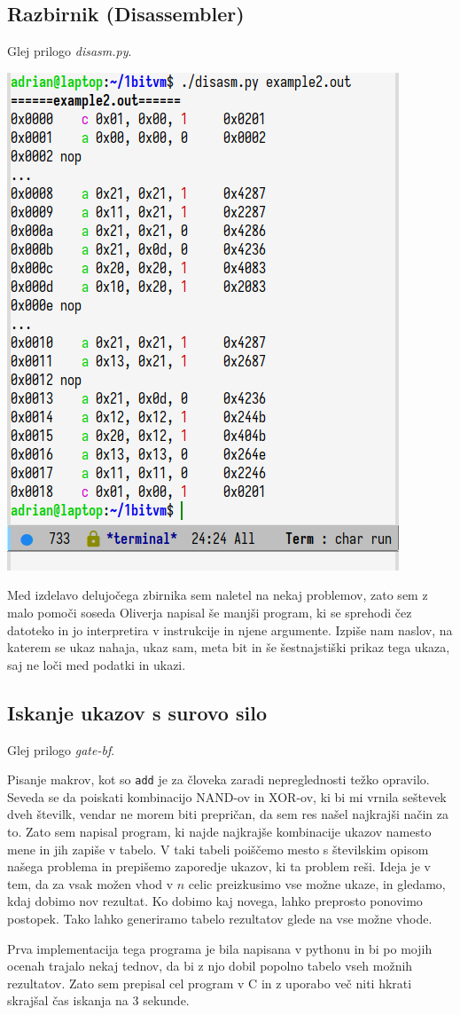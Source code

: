 \documentclass[12pt]{article}
\begin{document}
\subsection{Razbirnik (Disassembler)}
Glej prilogo \textit{disasm.py}.


\begin{center}
  \includegraphics[width=.4\linewidth]{slike/razbirnik.png}
\end{center}
\hfill
Med izdelavo delujočega zbirnika sem naletel na nekaj problemov, zato sem z malo pomoči soseda Oliverja napisal še manjši program, ki se sprehodi čez datoteko in jo interpretira v instrukcije in njene argumente.
Izpiše nam naslov, na katerem se ukaz nahaja, ukaz sam, meta bit in še šestnajstiški prikaz tega ukaza, saj ne loči med podatki in ukazi.

\subsection{Iskanje ukazov s surovo silo}
Glej prilogo \textit{gate-bf}.

Pisanje makrov, kot so \texttt{add} je za človeka zaradi nepreglednosti težko opravilo.
Seveda se da poiskati kombinacijo NAND-ov in XOR-ov, ki bi mi vrnila seštevek dveh številk, vendar ne morem biti prepričan, da sem res našel najkrajši način za to.
Zato sem napisal program, ki najde najkrajše kombinacije ukazov namesto mene in jih zapiše v tabelo.
V taki tabeli poiščemo mesto s številskim opisom našega problema in prepišemo zaporedje ukazov, ki ta problem reši.
Ideja je v tem, da za vsak možen vhod v $n$ celic preizkusimo vse možne ukaze, in gledamo, kdaj dobimo nov rezultat.
Ko dobimo kaj novega, lahko preprosto ponovimo postopek.
Tako lahko generiramo tabelo rezultatov glede na vse možne vhode.

Prva implementacija tega programa je bila napisana v pythonu in bi po mojih ocenah trajalo nekaj tednov, da bi z njo dobil popolno tabelo vseh možnih rezultatov.
Zato sem prepisal cel program v C in z uporabo več niti hkrati skrajšal čas iskanja na 3 sekunde.
\end{document}
